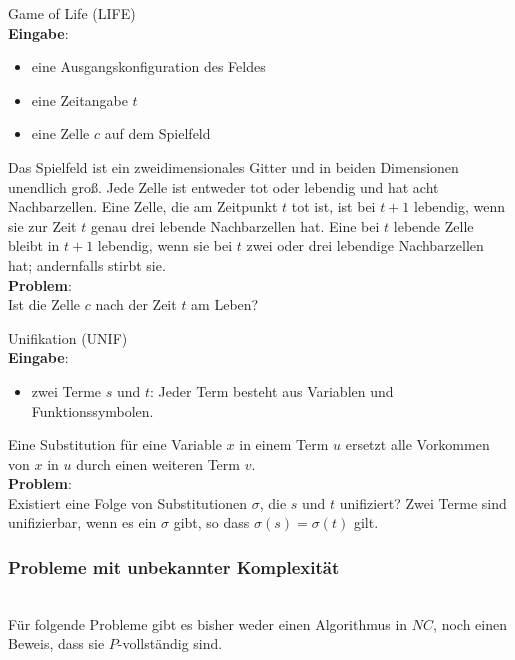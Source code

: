 \begin{problem}
    Game of Life (LIFE) \\
    \textbf{Eingabe}:
    \begin{itemize}
        \item eine Ausgangskonfiguration des Feldes
        \item eine Zeitangabe $t$
        \item eine Zelle $c$ auf dem Spielfeld
    \end{itemize}
    Das Spielfeld ist ein zweidimensionales Gitter und in beiden Dimensionen
    unendlich groß.
    Jede Zelle ist entweder tot oder lebendig und hat acht Nachbarzellen.
    Eine Zelle, die am Zeitpunkt $t$ tot ist, ist bei $t+1$ lebendig,
    wenn sie zur Zeit $t$ genau drei lebende Nachbarzellen hat.
    Eine bei $t$ lebende Zelle bleibt in $t+1$ lebendig, wenn sie bei $t$ zwei
    oder drei lebendige Nachbarzellen hat; andernfalls stirbt sie. \\
    \textbf{Problem}: \\
    Ist die Zelle $c$ nach der Zeit $t$ am Leben?
    \cite[S.211]{greenlaw}
\end{problem}

\begin{problem}
    Unifikation (UNIF) \\
    \textbf{Eingabe}:
    \begin{itemize}
        \item zwei Terme $s$ und $t$: Jeder Term besteht aus Variablen und
            Funktionssymbolen.
    \end{itemize}
    Eine Substitution für eine Variable $x$ in einem Term $u$ ersetzt alle
    Vorkommen von $x$ in $u$ durch einen weiteren Term $v$. \\
    \textbf{Problem}: \\
    Existiert eine Folge von Substitutionen $\sigma$, die $s$ und $t$
    unifiziert?
    Zwei Terme sind unifizierbar, wenn es ein $\sigma$ gibt, so dass
    $\sigma(s) = \sigma(t)$ gilt.
    \cite[S.171]{greenlaw}
\end{problem}

\subsubsection{Probleme mit unbekannter Komplexität} \hfill \\
Für folgende Probleme gibt es bisher weder einen Algorithmus in $NC$,
noch einen Beweis, dass sie $P$-vollständig sind.


